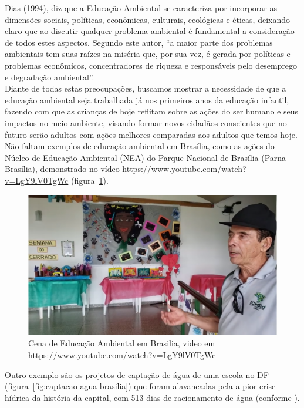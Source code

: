 Dias (1994), diz que a Educação Ambiental se caracteriza por incorporar as dimensões sociais, políticas, econômicas, culturais, ecológicas e éticas, deixando claro que ao discutir qualquer problema ambiental é fundamental a consideração de todos estes aspectos. Segundo este autor, “a maior parte dos problemas ambientais tem suas raízes na miséria que, por sua vez, é gerada por políticas e problemas econômicos, concentradores de riqueza e responsáveis pelo desemprego e degradação ambiental”.\\

Diante de todas estas preocupações, buscamos mostrar a necessidade de que a educação ambiental seja trabalhada já nos primeiros anos da educação infantil, fazendo com que as crianças de hoje reflitam sobre as ações do ser humano e seus impactos no meio ambiente, visando formar novos cidadãos conscientes que no futuro serão adultos com ações melhores comparadas aos adultos que temos hoje.\\

Não faltam exemplos de educação ambiental em Brasília, como as ações do Núcleo de Educação Ambiental (NEA) do Parque Nacional de Brasília (Parna Brasília), demonstrado no vídeo \url{https://www.youtube.com/watch?v=LgY9lV0TgWc} (figura~\ref{fig:educacao-ambiental-em-brasilia}).

\begin{figure}[h!]
    \centering
    \includegraphics[width=0.7\linewidth]{"fig/Educação Ambiental em Brasília"}
    \caption[Educação Ambiental em Brasilia]{Cena de Educação Ambiental em Brasilia, video em \url{https://www.youtube.com/watch?v=LgY9lV0TgWc}}
    \label{fig:educacao-ambiental-em-brasilia}
\end{figure}

Outro exemplo são os projetos de captação de água de uma escola no DF (figura~\ref{fig:captacao-agua-brasilia}) que foram alavancadas pela a pior crise hídrica da história da capital, com 513 dias de racionamento de água (conforme ).

